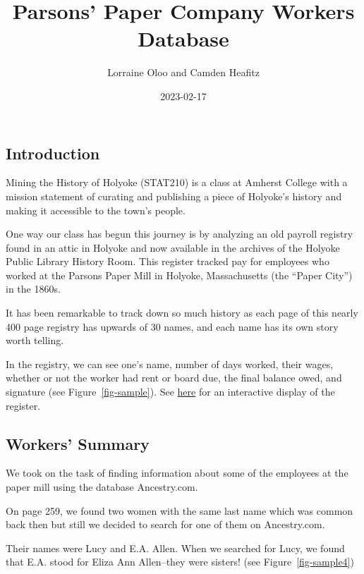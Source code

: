 \documentclass[
  letterpaper,
  DIV=11,
  numbers=noendperiod]{scrartcl}
\title{Parsons' Paper Company Workers Database}
\author{Lorraine Oloo and Camden Heafitz}
\date{2023-02-17}
\begin{document}
\maketitle
\ifdefined\Shaded\renewenvironment{Shaded}{\begin{tcolorbox}[frame hidden, breakable, borderline west={3pt}{0pt}{shadecolor}, enhanced, sharp corners, interior hidden, boxrule=0pt]}{\end{tcolorbox}}\fi

\hypertarget{introduction}{%
\subsection{Introduction}\label{introduction}}

Mining the History of Holyoke (STAT210) is a class at Amherst College
with a mission statement of curating and publishing a piece of Holyoke's
history and making it accessible to the town's people.

One way our class has begun this journey is by analyzing an old payroll
registry found in an attic in Holyoke and now available in the archives
of the Holyoke Public Library History Room. This register tracked pay
for employees who worked at the Parsons Paper Mill in Holyoke,
Massachusetts (the ``Paper City'') in the 1860s.

It has been remarkable to track down so much history as each page of
this nearly 400 page registry has upwards of 30 names, and each name has
its own story worth telling.

In the registry, we can see one's name, number of days worked, their
wages, whether or not the worker had rent or board due, the final
balance owed, and signature (see Figure~\ref{fig-sample}). See
\href{https://r.amherst.edu/apps/nhorton/Parsons-Paper/}{here} for an
interactive display of the register.

\hypertarget{workers-summary}{%
\subsection{Workers' Summary}\label{workers-summary}}

We took on the task of finding information about some of the employees
at the paper mill using the database Ancestry.com.

On page 259, we found two women with the same last name which was common
back then but still we decided to search for one of them on
Ancestry.com.

Their names were Lucy and E.A. Allen. When we searched for Lucy, we
found that E.A. stood for Eliza Ann Allen--they were sisters! (see
Figure~\ref{fig-sample4})
\end{document}
